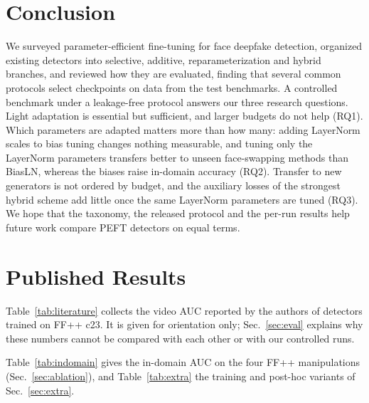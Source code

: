 \documentclass[fonts]{icst}
\begin{document}
\section{Conclusion}
We surveyed parameter-efficient fine-tuning for face deepfake detection, organized existing detectors into selective, additive, reparameterization and hybrid branches, and reviewed how they are evaluated, finding that several common protocols select checkpoints on data from the test benchmarks. A controlled benchmark under a leakage-free protocol answers our three research questions. Light adaptation is essential but sufficient, and larger budgets do not help (RQ1). Which parameters are adapted matters more than how many: adding LayerNorm scales to bias tuning changes nothing measurable, and tuning only the LayerNorm parameters transfers better to unseen face-swapping methods than BiasLN, whereas the biases raise in-domain accuracy (RQ2). Transfer to new generators is not ordered by budget, and the auxiliary losses of the strongest hybrid scheme add little once the same LayerNorm parameters are tuned (RQ3). We hope that the taxonomy, the released protocol and the per-run results help future work compare PEFT detectors on equal terms.

\appendix
\renewcommand{\thesection}{A}\renewcommand{\thetable}{A\arabic{table}}\setcounter{table}{0}
\section{Published Results}
\label{sec:appendix}
Table~\ref{tab:literature} collects the video AUC reported by the authors of detectors trained on FF++ c23. It is given for orientation only; Sec.~\ref{sec:eval} explains why these numbers cannot be compared with each other or with our controlled runs.

\begin{table}[!t]
\centering
\caption{Published video AUC of detectors trained on FF++ c23, as reported by their authors (mostly Table~1 of Effort~\cite{yan2025effort}). Selection rules, frames and seeds differ between rows; the numbers are listed for reference only and are not comparable with Tables~\ref{tab:main}--\ref{tab:perdataM}. $^\dagger$: values reported by Effort.}
\label{tab:literature}
\resizebox{\textwidth}{!}{}
\end{table}

Table~\ref{tab:indomain} gives the in-domain AUC on the four FF++ manipulations (Sec.~\ref{sec:ablation}), and Table~\ref{tab:extra} the training and post-hoc variants of Sec.~\ref{sec:extra}.
\end{document}
